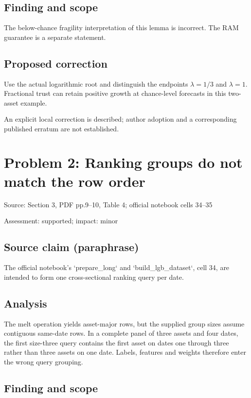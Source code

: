 \documentclass[11pt]{article}
\begin{document}
\subsection*{Finding and scope}

The below-chance fragility interpretation of this lemma is incorrect. The RAM guarantee is a separate statement.

\subsection*{Proposed correction}

Use the actual logarithmic root and distinguish the endpoints \(\lambda=1/3\) and \(\lambda=1\). Fractional trust can retain positive growth at chance-level forecasts in this two-asset example.

An explicit local correction is described; author adoption and a corresponding published erratum are not established.

\section*{Problem 2: Ranking groups do not match the row order}

Source: Section 3, PDF pp.9–10, Table 4; official notebook cells 34–35

Assessment: supported; impact: minor

\subsection*{Source claim (paraphrase)}

The official notebook’s `prepare\_long` and `build\_lgb\_dataset`, cell 34, are intended to form one cross-sectional ranking query per date.

\subsection*{Analysis}

The melt operation yields asset-major rows, but the supplied group sizes assume contiguous same-date rows. In a complete panel of three assets and four dates, the first size-three query contains the first asset on dates one through three rather than three assets on one date. Labels, features and weights therefore enter the wrong query grouping.

\subsection*{Finding and scope}
\end{document}
